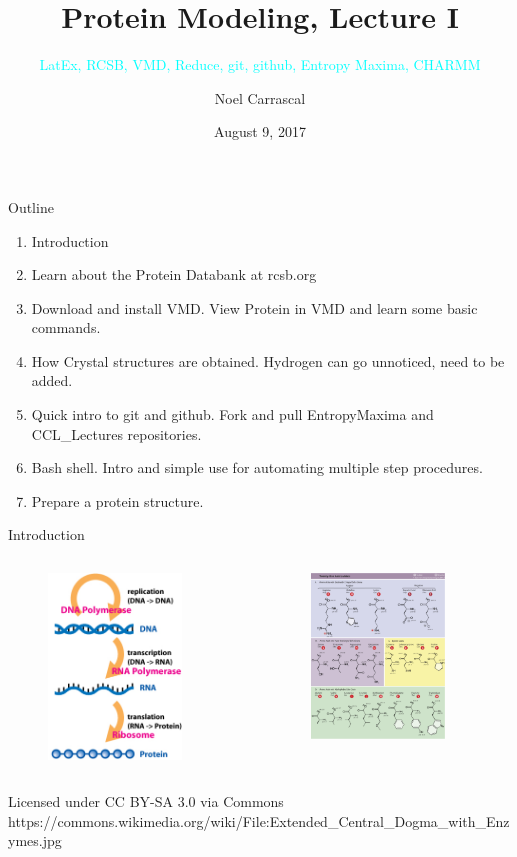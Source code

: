 \documentclass{beamer}
\title{Protein Modeling, Lecture I}
\subtitle{\textcolor{cyan}{\small LatEx, RCSB, VMD, Reduce, git, github, Entropy Maxima, CHARMM}}
\author{Noel Carrascal}
\date{August 9, 2017}
\begin{document}
\maketitle
\begin{frame}{Outline}
   \begin{enumerate}
      \item Introduction
      \item Learn about the Protein Databank at rcsb.org
      \item Download and install VMD. View Protein in VMD and learn some basic commands.
      \item How Crystal structures are obtained. Hydrogen can go unnoticed, need to be added.
      \item Quick intro to git and github. Fork and pull EntropyMaxima and CCL\_Lectures repositories.
      \item Bash shell. Intro and simple use for automating multiple step procedures.
      \item Prepare a protein structure.
   \end{enumerate}
\end{frame}
\begin{frame}{Introduction}
  \begin{columns}
      \begin{column}{0.5\textwidth}
        \begin{figure}
           \includegraphics[width=1.4in]{../../Lecture_Pictures/Extended_Central_Dogma_with_Enzymes}
        \end{figure}
      \end{column}
      \begin{column}{0.5\textwidth}
        \begin{figure}
           \includegraphics[width=1.4in]{../../Lecture_Pictures/Amino_Acids}
        \end{figure}
      \end{column}
   \end{columns}
   {\tiny Licensed under CC BY-SA 3.0 via Commons https://commons.wikimedia.org/wiki/File:Extended\_Central\_Dogma\_with\_Enzymes.jpg}
\end{frame}
\end{document}
